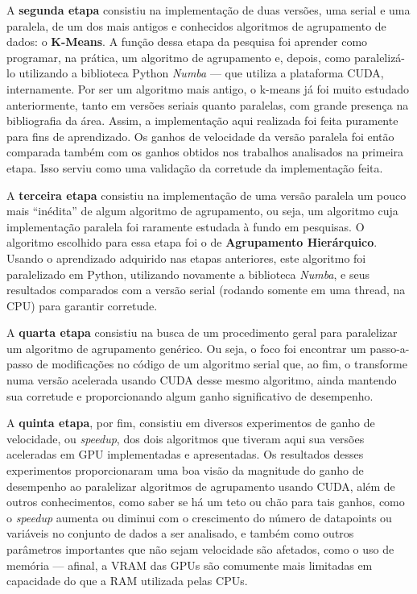 \documentclass[12pt,
openright, 
oneside, %
a4paper,    %
brazil]{facom-ufu-abntex2}
\def\qntAlgrtm{dois}
\begin{document}
A \textbf{segunda etapa} consistiu na implementação de duas versões, uma serial e uma paralela, de um dos mais antigos e conhecidos algoritmos de agrupamento de dados: o \textbf{K-Means}. A função dessa etapa da pesquisa foi aprender como programar, na prática, um algoritmo de agrupamento e, depois, como paralelizá-lo utilizando a biblioteca Python \textit{Numba} --- que utiliza a plataforma CUDA, internamente. Por ser um algoritmo mais antigo, o k-means já foi muito estudado anteriormente, tanto em versões seriais quanto paralelas, com grande presença na bibliografia da área. Assim, a implementação aqui realizada foi feita puramente para fins de aprendizado. Os ganhos de velocidade da versão paralela foi então comparada também com os ganhos obtidos nos trabalhos analisados na primeira etapa. Isso serviu como uma validação da corretude da implementação feita.

A \textbf{terceira etapa} consistiu na implementação de uma versão paralela um pouco mais \enquote{inédita} de algum algoritmo de agrupamento, ou seja, um algoritmo cuja implementação paralela foi raramente estudada à fundo em pesquisas. O algoritmo escolhido para essa etapa foi o de \textbf{Agrupamento Hierárquico}. Usando o aprendizado adquirido nas etapas anteriores, este algoritmo foi paralelizado em Python, utilizando novamente a biblioteca \textit{Numba}, e seus resultados comparados com a versão serial (rodando somente em uma thread, na CPU) para garantir corretude.

A \textbf{quarta etapa} consistiu na busca de um procedimento geral para paralelizar um algoritmo de agrupamento genérico. Ou seja, o foco foi encontrar um passo-a-passo de modificações no código de um algoritmo serial que, ao fim, o transforme numa versão acelerada usando CUDA desse mesmo algoritmo, ainda mantendo sua corretude e proporcionando algum ganho significativo de desempenho.

A \textbf{quinta etapa}, por fim, consistiu em diversos experimentos de ganho de velocidade, ou \textit{speedup}, dos \qntAlgrtm{} algoritmos que tiveram aqui sua versões aceleradas em GPU implementadas e apresentadas. Os resultados desses experimentos proporcionaram uma boa visão da magnitude do ganho de desempenho ao paralelizar algoritmos de agrupamento usando CUDA, além de outros conhecimentos, como saber se há um teto ou chão para tais ganhos, como o \textit{speedup} aumenta ou diminui com o crescimento do número de datapoints ou variáveis no conjunto de dados a ser analisado, e também como outros parâmetros importantes que não sejam velocidade são afetados, como o uso de memória --- afinal, a VRAM das GPUs são comumente mais limitadas em capacidade do que a RAM utilizada pelas CPUs.
\end{document}
